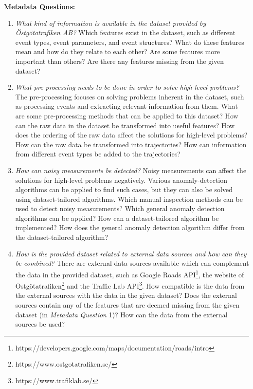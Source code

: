 \begin{description}
  \item \textbf{Metadata Questions:}
  \begin{enumerate}
    \item \textit{What kind of information is available in the dataset provided by Östgötatrafiken AB?} \newline
    Which features exist in the dataset, such as different event types, event parameters, and event structures?
    What do these features mean and how do they relate to each other?
    Are some features more important than others?
    Are there any features missing from the given dataset?
    \item \textit{What pre-processing needs to be done in order to solve high-level problems?} \newline
    The pre-processing focuses on solving problems inherent in the dataset, such as processing events and extracting relevant information from them.
    What are some pre-processing methods that can be applied to this dataset?
    How can the raw data in the dataset be transformed into useful features?
    How does the ordering of the raw data affect the solutions for high-level problems?
    How can the raw data be transformed into trajectories?
    How can information from different event types be added to the trajectories?
    \item \textit{How can noisy measurements be detected?} \newline
    Noisy measurements can affect the solutions for high-level problems negatively.
    Various anomaly-detection algorithms can be applied to find such cases, but they can also be solved using dataset-tailored algorithms.
    Which manual inspection methods can be used to detect noisy measurements?
    Which general anomaly detection algorithms can be applied?
    How can a dataset-tailored algorithm be implemented?
    How does the general anomaly detection algorithm differ from the dataset-tailored algorithm?
    \item \textit{How is the provided dataset related to external data sources and how can they be combined?} \newline
    There are external data sources available which can complement the data in the provided dataset, such as Google Roads API\footnote{https://developers.google.com/maps/documentation/roads/intro}, the website of Östgötatrafiken\footnote{https://www.ostgotatrafiken.se/} and the Traffic Lab API\footnote{https://www.trafiklab.se/}.
    How compatible is the data from the external sources with the data in the given dataset?
    Does the external sources contain any of the features that are deemed missing from the given dataset (in \textit{Metadata Question} 1)? 
    How can the data from the external sources be used?
  \end{enumerate}


\end{description}
